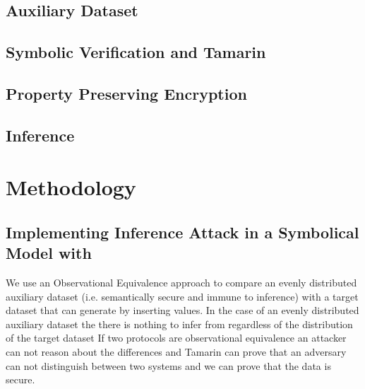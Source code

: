 \documentclass[journal]{IEEEtran}
\begin{document}
\subsection{Auxiliary Dataset}
\subsection{Symbolic Verification and Tamarin}
\subsection{Property Preserving Encryption}
\subsection{Inference}
\section{Methodology}
\subsection{Implementing Inference Attack in a Symbolical Model with \tamarin{}}
We use an Observational Equivalence approach to compare an evenly distributed auxiliary dataset (i.e. semantically secure and immune to inference) with a target dataset that \tamarin{} can generate by inserting values. In the case of an evenly distributed auxiliary dataset the there is nothing to infer from regardless of the distribution of the target dataset If two protocols are observational equivalence an attacker can not reason about the differences and Tamarin can prove that an adversary can not distinguish between two systems and we can prove that the data is secure.
\end{document}

